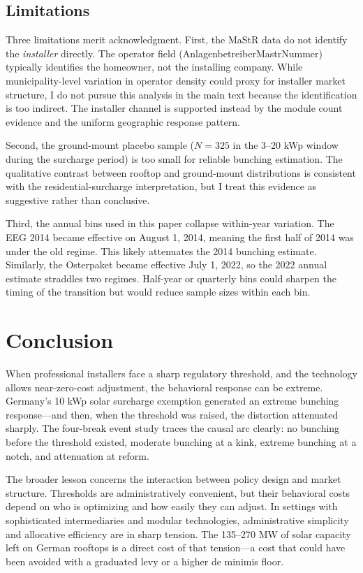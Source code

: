 \documentclass[12pt]{article}
\begin{document}
\subsection{Limitations}

Three limitations merit acknowledgment. First, the MaStR data do not identify the \textit{installer} directly. The operator field (AnlagenbetreiberMastrNummer) typically identifies the homeowner, not the installing company. While municipality-level variation in operator density could proxy for installer market structure, I do not pursue this analysis in the main text because the identification is too indirect. The installer channel is supported instead by the module count evidence and the uniform geographic response pattern.

Second, the ground-mount placebo sample ($N = 325$ in the 3--20 kWp window during the surcharge period) is too small for reliable bunching estimation. The qualitative contrast between rooftop and ground-mount distributions is consistent with the residential-surcharge interpretation, but I treat this evidence as suggestive rather than conclusive.

Third, the annual bins used in this paper collapse within-year variation. The EEG 2014 became effective on August 1, 2014, meaning the first half of 2014 was under the old regime. This likely attenuates the 2014 bunching estimate. Similarly, the Osterpaket became effective July 1, 2022, so the 2022 annual estimate straddles two regimes. Half-year or quarterly bins could sharpen the timing of the transition but would reduce sample sizes within each bin.




\section{Conclusion}
\label{sec:conclusion}

When professional installers face a sharp regulatory threshold, and the technology allows near-zero-cost adjustment, the behavioral response can be extreme. Germany's 10 kWp solar surcharge exemption generated an extreme bunching response---and then, when the threshold was raised, the distortion attenuated sharply. The four-break event study traces the causal arc clearly: no bunching before the threshold existed, moderate bunching at a kink, extreme bunching at a notch, and attenuation at reform.

The broader lesson concerns the interaction between policy design and market structure. Thresholds are administratively convenient, but their behavioral costs depend on who is optimizing and how easily they can adjust. In settings with sophisticated intermediaries and modular technologies, administrative simplicity and allocative efficiency are in sharp tension. The 135--270 MW of solar capacity left on German rooftops is a direct cost of that tension---a cost that could have been avoided with a graduated levy or a higher de minimis floor.
\end{document}
